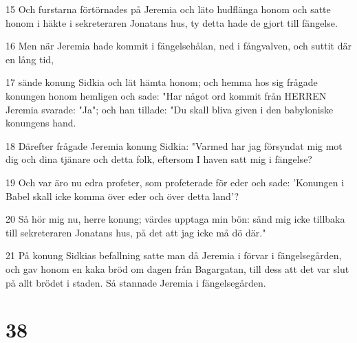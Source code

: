 \par 15 Och furstarna förtörnades på Jeremia och läto hudflänga honom och satte honom i häkte i sekreteraren Jonatans hus, ty detta hade de gjort till fängelse.
\par 16 Men när Jeremia hade kommit i fängelsehålan, ned i fångvalven, och suttit där en lång tid,
\par 17 sände konung Sidkia och lät hämta honom; och hemma hos sig frågade konungen honom hemligen och sade: "Har något ord kommit från HERREN Jeremia svarade: "Ja"; och han tillade: "Du skall bliva given i den babyloniske konungens hand.
\par 18 Därefter frågade Jeremia konung Sidkia: "Varmed har jag försyndat mig mot dig och dina tjänare och detta folk, eftersom I haven satt mig i fängelse?
\par 19 Och var äro nu edra profeter, som profeterade för eder och sade: 'Konungen i Babel skall icke komma över eder och över detta land'?
\par 20 Så hör mig nu, herre konung; värdes upptaga min bön: sänd mig icke tillbaka till sekreteraren Jonatans hus, på det att jag icke må dö där."
\par 21 På konung Sidkias befallning satte man då Jeremia i förvar i fängelsegården, och gav honom en kaka bröd om dagen från Bagargatan, till dess att det var slut på allt brödet i staden. Så stannade Jeremia i fängelsegården.

\chapter{38}

